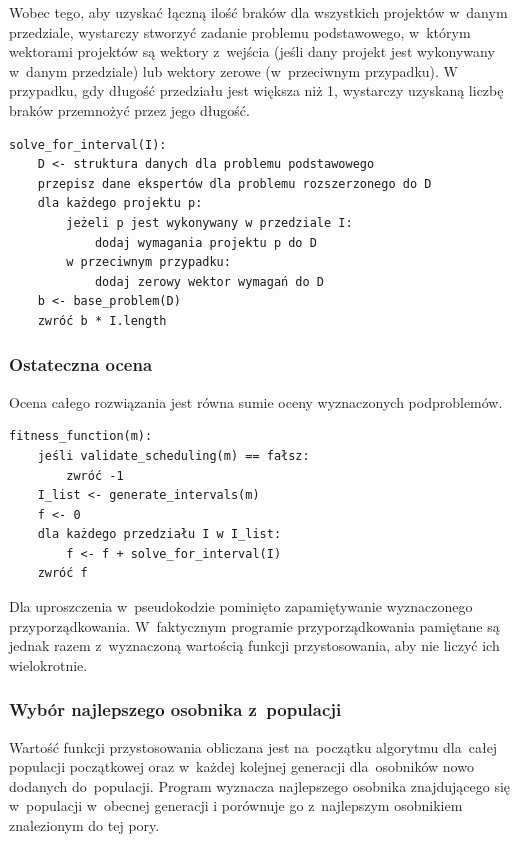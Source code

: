 \documentclass[12pt,a4paper]{article}
\theoremstyle{definition}
\begin{document}
\noindent
Wobec tego, aby uzyskać łączną ilość braków dla wszystkich projektów w~danym przedziale, wystarczy stworzyć zadanie problemu podstawowego, w~którym wektorami projektów są wektory z~wejścia (jeśli dany projekt jest wykonywany w~danym przedziale) lub wektory zerowe (w~przeciwnym przypadku).
W przypadku, gdy długość przedziału jest większa niż 1, wystarczy uzyskaną liczbę braków przemnożyć przez jego długość.\\

\begin{tcolorbox}[title=Ocena podproblemu]
\begin{verbatim}
solve_for_interval(I):
    D <- struktura danych dla problemu podstawowego
    przepisz dane ekspertów dla problemu rozszerzonego do D
    dla każdego projektu p:
        jeżeli p jest wykonywany w przedziale I:
            dodaj wymagania projektu p do D
        w przeciwnym przypadku:
            dodaj zerowy wektor wymagań do D
    b <- base_problem(D)
    zwróć b * I.length  
\end{verbatim}
\end{tcolorbox}

\subsubsection*{Ostateczna ocena}
Ocena całego rozwiązania jest równa sumie oceny wyznaczonych podproblemów.\\

\begin{tcolorbox}[title=Ocena pojedynczego rozwiązania]
\begin{verbatim}
fitness_function(m):
    jeśli validate_scheduling(m) == fałsz:
        zwróć -1
    I_list <- generate_intervals(m)
    f <- 0
    dla każdego przedziału I w I_list:
        f <- f + solve_for_interval(I)
    zwróć f
\end{verbatim}
\end{tcolorbox}
\vspace{0.5em}
\noindent
Dla uproszczenia w~pseudokodzie pominięto zapamiętywanie wyznaczonego przyporządkowania.
W~faktycznym programie przyporządkowania pamiętane są jednak razem z~wyznaczoną wartością funkcji przystosowania, aby nie liczyć ich wielokrotnie.

\newpage
\subsubsection{Wybór najlepszego osobnika z~populacji}
Wartość funkcji przystosowania obliczana jest na~początku algorytmu dla~całej populacji początkowej oraz w~każdej kolejnej generacji dla~osobników nowo dodanych do~populacji.
Program wyznacza najlepszego osobnika znajdującego się w~populacji w~obecnej generacji i porównuje go z~najlepszym osobnikiem znalezionym do tej pory. \\
\end{document}
